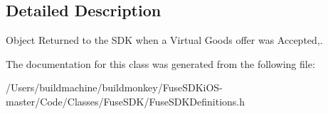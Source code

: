 \subsection{Detailed Description}
Object Returned to the S\+D\+K when a Virtual Goods offer was Accepted,. 

The documentation for this class was generated from the following file\+:\begin{DoxyCompactItemize}
\item 
/\+Users/buildmachine/buildmonkey/\+Fuse\+S\+D\+Ki\+O\+S-\/master/\+Code/\+Classes/\+Fuse\+S\+D\+K/Fuse\+S\+D\+K\+Definitions.\+h\end{DoxyCompactItemize}
